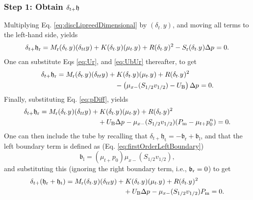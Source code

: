 \subsubsection{Step 1: Obtain $\delta_{t+} \mathfrak{h}$} 
Multiplying Eq. \eqref{eq:discLipreedDimensional} by $(\delta_{t\cdot}y)$, and moving all terms to the left-hand side, yields
\begin{equation*}
    \delta_{t+} \mathfrak{h}_{\text{r}} = M_\text{r}(\delta_{t\cdot}y^{})(\delta_{tt}y^{}) + K(\delta_{t\cdot}y^{})(\mu_{t\cdot}y^{}) + R(\delta_{t\cdot}y^{})^2 - S_\text{r}(\delta_{t\cdot}y^{})\Delta p^{} = 0.
\end{equation*}
One can substitute Eqs \eqref{eq:Ur}, and \eqref{eq:UbUr} thereafter, to get
\begin{align*}
    \delta_{t+} \mathfrak{h}_{\text{r}} = M_\text{r}(\delta_{t\cdot}y^{})(\delta_{tt}y^{}) &+ K(\delta_{t\cdot}y^{})(\mu_{t\cdot}y^{}) + R(\delta_{t\cdot}y^{})^2 \\
    &\quad- \left(\mu_{x-}(S_{1/2}v_{1/2})-U_\text{B}\right)\Delta p^{} = 0.
\end{align*}
Finally, substituting Eq. \eqref{eq:pDiff}, yields
\begin{align*}
    \delta_{t+} \mathfrak{h}_{\text{r}} = M_\text{r}(\delta_{t\cdot}y^{})(\delta_{tt}y^{}) &+ K(\delta_{t\cdot}y^{})(\mu_{t\cdot}y^{}) + R(\delta_{t\cdot}y^{})^2 \\
    &\quad+ U_\text{B}\Delta p^{} - \mu_{x-}(S_{1/2}v_{1/2})(P_{\text{m}}-\mu_{t+} p_0^n) = 0.
\end{align*}
One can then include the tube by recalling that $\delta_{t+}\mathfrak{h}_\text{t} = -\mathfrak{b}_\text{r} + \mathfrak{b}_\text{l}$, and that the left boundary term is defined as (Eq. \eqref{eq:firstOrderLeftBoundary})
\begin{equation*}
    \mathfrak{b}_\text{l} = (\mu_{t+}p_0)\mu_{x-}(S_{1/2}v_{1/2}),
\end{equation*} 
and substituting this (ignoring the right boundary term, i.e., $\mathfrak{b}_{\text{r}} = 0$) to get
\begin{align*}
    \delta_{t+} (\mathfrak{h}_{\text{r}} +\mathfrak{h}_{\text{t}}) = M_\text{r}(\delta_{t\cdot}y^{})(\delta_{tt}y^{}) &+ K(\delta_{t\cdot}y^{})(\mu_{t\cdot}y^{}) + R(\delta_{t\cdot}y^{})^2 \\
    &\quad+ U_\text{B}\Delta p^{} - \mu_{x-}(S_{1/2}v_{1/2})P_{\text{m}} = 0.
\end{align*}
